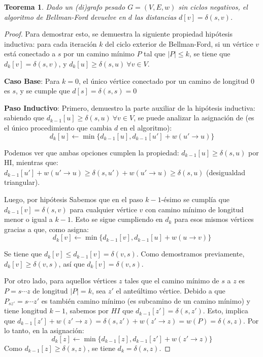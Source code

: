 \documentclass[a4paper]{report}
\newtheorem*{theorem*}{Teorema}
\begin{document}
\begin{theorem*}
    Dado un (di)grafo pesado $G = (V, E, w)$ sin ciclos negativos, el algoritmo de Bellman-Ford devuelve en $d$ las distancias $d[v] = \delta(s, v)$.
\end{theorem*}
\begin{proof}
    Para demostrar esto, se demuestra la siguiente propiedad hipótesis inductiva: para cada iteración $k$ del ciclo exterior de Bellman-Ford, si un vértice $v$ está conectado a $s$ por un camino mínimo $P$ tal que $|P| \leq k$, se tiene que $d_{k}[v] = \delta(s, v)$, y $d_k[u] \geq \delta(s, u)\ \forall v \in V$.

    \textbf{Caso Base}: Para $k = 0$, el único vértice conectado por un camino de longitud $0$ es $s$, y se cumple que $d[s] = \delta(s, s) = 0$

    \textbf{Paso Inductivo}: Primero, demuestro la parte auxiliar de la hipótesis inductiva: sabiendo que $d_{k - 1}[u] \geq \delta(s, u)\ \forall v \in V$, se puede analizar la asignación de  (es el único procedimiento que cambia $d$ en el algoritmo):
    $$d_k[u] \gets \min{\{d_{k - 1}[u], d_{k - 1}[u'] + w(u' \rightarrow u)\}}$$

    Podemos ver que ambas opciones cumplen la propiedad: $d_{k - 1}[u] \geq \delta(s, u)$ por HI, mientras que: $d_{k - 1}[u'] + w(u' \rightarrow u) \geq \delta(s, u') + w(u' \rightarrow u) \geq \delta(s, u)$ (desigualdad triangular).

    Luego, por hipótesis Sabemos que en el paso $k - 1$-ésimo se cumplía que $d_{k - 1}[v] = \delta(s, v)$ para cualquier vértice $v$ con camino mínimo de longitud menor o igual a $k - 1$. Esto se sigue cumpliendo en $d_k$ para esos mismos vértices gracias a que, como  asigna:
    $$d_k[v] \gets \min{\{d_{k - 1}[v], d_{k - 1}[u] + w(u \rightarrow v)\}}$$

    Se tiene que $d_k[v] \leq d_{k - 1}[v] = \delta(v, s)$. Como demostramos previamente, $d_k[v] \geq \delta(v, s)$, así que $d_k[v] = \delta(v, s)$.

    Por otro lado, para aquellos vértices $z$ tales que el camino mínimo de $s$ a $z$ es $P = s \cdots z$ de longitud $|P| = k$, sea $z'$ el anteúltimo vértice. Debido a que $P_{sz'} = s \cdots z'$ es también camino mínimo (es subcamino de un camino mínimo) y tiene longitud $k - 1$, sabemos por $HI$ que $d_{k - 1}[z'] = \delta(s, z')$. Esto, implica que $d_{k - 1}[z'] + w(z' \rightarrow z) = \delta(s, z') + w(z' \rightarrow z) = w(P) = \delta(s, z)$. Por lo tanto, en la asignación:
    $$d_k[z] \gets \min{\{d_{k - 1}[z], d_{k - 1}[z'] + w(z' \rightarrow z)\}}$$
    Como $d_{k - 1}[z] \geq \delta(s, z)$, se tiene $d_k = \delta(s, z)$.


\end{proof}
\end{document}
